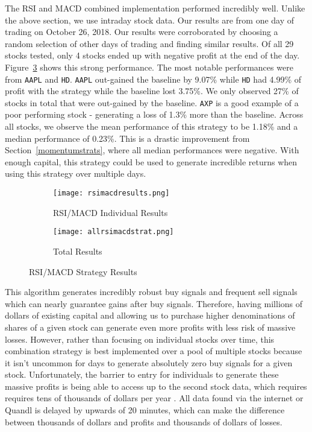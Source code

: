 \documentclass[../thesis.tex]{subfiles}
\begin{document}
The RSI and MACD combined implementation performed incredibly well. Unlike the above section, we use intraday stock data. Our results are from one day of trading on October 26, 2018. Our results were corroborated by choosing a random selection of other days of trading and finding similar results. Of all 29 stocks tested, only 4 stocks ended up with negative profit at the end of the day. Figure~\ref{RSIMACDRESULTSfigure} shows this strong performance. The most notable performances were from \texttt{AAPL} and \texttt{HD}. \texttt{AAPL} out-gained the baseline by 9.07\%  while \texttt{HD} had 4.99\% of profit with the strategy while the baseline lost 3.75\%.  We only observed 27\% of stocks in total that were out-gained by the baseline. \texttt{AXP} is a good example of a poor performing stock - generating a loss of 1.3\% more than the baseline. Across all stocks, we observe the mean performance of this strategy to be 1.18\% and a median performance of 0.23\%. This is a drastic improvement from Section~\ref{momentumstrats}, where all median performances were negative. With enough capital, this strategy could be used to generate incredible returns when using this strategy over multiple days. 

\begin{figure}[h!]
\centering

\begin{subfigure}[t]{0.74\textwidth}
\texttt{[image: rsimacdresults.png]}
\caption{RSI/MACD Individual Results\label{overflow}}
\end{subfigure}
\begin{subfigure}[t]{.215\textwidth}
\texttt{[image: allrsimacdstrat.png]}
\caption{ Total Results \label{overflow}}
\end{subfigure}

\caption{RSI/MACD Strategy Results  \label{overflow}}
\label{RSIMACDRESULTSfigure}
\end{figure}

This algorithm generates incredibly robust buy signals and frequent sell signals which can nearly guarantee gains after buy signals. Therefore, having millions of dollars of existing capital and allowing us to purchase higher denominations of shares of a given stock can generate even more profits with less risk of massive losses. However, rather than focusing on individual stocks over time, this combination strategy is best implemented over a pool of multiple stocks because it isn't uncommon for days to generate absolutely zero buy signals for a given stock. Unfortunately, the barrier to entry for individuals to generate these massive profits is being able to access up to the second stock data, which requires requires tens of thousands of dollars per year \cite{Treleaven2013}. All data found via the internet or Quandl is delayed by upwards of 20 minutes, which can make the difference between thousands of dollars and profits and thousands of dollars of losses.
\end{document}
